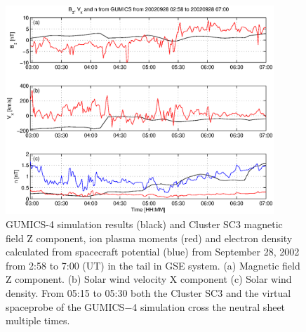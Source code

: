 \documentclass[linenumbers,draft]{agujournal}
\begin{document}
\begin{figure}[h]
\centering
\includegraphics[width=0.9\textwidth,angle=0]{swe-2020-corr-f20.eps}  
\caption{GUMICS-4 simulation results (black) and Cluster SC3 magnetic field Z component, ion plasma moments (red) and electron density calculated from spacecraft potential (blue) from September 28, 2002 from 2:58 to 7:00 (UT) in the tail in GSE system. (a) Magnetic field Z component. (b) Solar wind velocity X component (c) Solar wind density. From 05:15 to 05:30 both the Cluster SC3 and the virtual spaceprobe of the GUMICS$-$4 simulation cross the neutral sheet multiple times.}
\label{fig:nsplot}
\end{figure}

\pagebreak



\pagebreak
\end{document}
